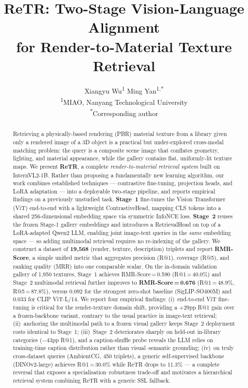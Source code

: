 \documentclass[10pt,twocolumn]{article}
\title{\textbf{ReTR: Two-Stage Vision-Language Alignment\\
for Render-to-Material Texture Retrieval}}
\author{
  Xiangyu Wu\textsuperscript{1}\quad
  Ming Yan\textsuperscript{1,*}\\[4pt]
  \textsuperscript{1}MIAO, Nanyang Technological University\\
  \textsuperscript{*}Corresponding author
}
\date{}
\begin{document}
\maketitle

\begin{abstract}
Retrieving a physically-based rendering (PBR) material texture from a library
given only a rendered image of a 3D object is a practical but under-explored
cross-modal matching problem: the query is a composite scene image that
conflates geometry, lighting, and material appearance, while the gallery
contains flat, uniformly-lit texture maps.
We present \textbf{ReTR}, a complete \emph{render-to-material retrieval
system} built on InternVL2-1B.
Rather than proposing a fundamentally new learning algorithm, our work
combines established techniques — contrastive fine-tuning, projection heads,
and LoRA adaptation — into a deployable two-stage pipeline, and reports
empirical findings on a previously unstudied task.
\textbf{Stage~1} fine-tunes the Vision Transformer (ViT) end-to-end with a
lightweight ContrastiveHead, mapping CLS tokens into a shared 256-dimensional
embedding space via symmetric InfoNCE loss.
\textbf{Stage~2} reuses the frozen Stage-1 gallery embeddings and
introduces a RetrievalHead on top of a LoRA-adapted Qwen2 LLM, enabling
joint image-text queries in the \emph{same} embedding space — so adding
multimodal retrieval requires no re-indexing of the gallery.
We construct a dataset of \textbf{19,568} (render, texture, description)
triplets and report \textbf{RMR-Score}, a simple unified metric that
aggregates precision (R@1), coverage (R@5), and ranking quality (MRR) into
one comparable scalar.
On the in-domain validation gallery of 1,950 textures, Stage~1 achieves
RMR-Score\,=\,0.590 (R@1\,=\,40.0\%) and Stage~2 multimodal retrieval
further improves to \textbf{RMR-Score\,=\,0.676} (R@1\,=\,48.9\%,
R@5\,=\,87.8\%), versus 0.092 for the strongest zero-shot baseline
(SigLIP-SO400M) and 0.033 for CLIP ViT-L/14.
We report four empirical findings: (i)~end-to-end ViT fine-tuning is
critical for the render-texture domain shift, providing a $+29$pp R@1 gain
over a frozen-backbone variant, contrary to the usual practice in image-text
retrieval; (ii)~anchoring the multimodal path to a frozen visual gallery
keeps Stage~2 deployment costs identical to Stage~1; (iii)~Stage~2
deteriorates sharply on held-out in-library categories ($-43$pp R@1), and
a caption-shuffle probe reveals the LLM relies on training-time caption
distribution rather than visual--semantic grounding; (iv)~on truly
cross-dataset queries (AmbientCG, 450 triplets), a generic self-supervised
backbone (DINOv2-large) achieves R@1\,=\,30.0\% while ReTR drops to 11.3\%
--- a complete reversal that exposes a specialisation--robustness trade-off
and motivates a hierarchical retrieval system combining ReTR with a generic
SSL fallback.
\end{abstract}
\end{document}
